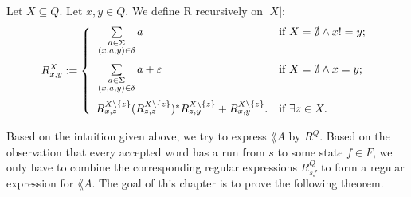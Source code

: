 \begin{definition}
    \label{R}
    Let $X \subseteq Q$. Let $x, y \in Q$.
    We define R recursively on $|X|$:
    \begin{equation*}
        R^X_{x,y} := \left\{  
                \begin{array}{ll}
                    \vphantom{ \sum\limits_{ \substack{ a \in \Sigma\\ (x,a,y) \in \delta \\ b \in \Sigma } } }
                    \sum\limits_{
                        \substack{
                            a \in \Sigma\\
                            (x,a,y) \in \delta
                        }
                    } a 
                    & \mbox{if } X = \emptyset \wedge x != y; \\
                    \vphantom{ \sum\limits_{ \substack{ a \in \Sigma\\ (x,a,y) \in \delta \\ b \in \Sigma } } }
                    \sum\limits_{
                        \substack{
                            a \in \Sigma\\
                            (x,a,y) \in \delta
                        }
                    } a + \varepsilon 
                    & \mbox{if } X = \emptyset \wedge x = y; \\
                     R^{X\backslash\{z\}}_{x,z} (R^{X\backslash\{z\}}_{z,z})^* R^{X\backslash\{z\}}_{z,y} + R^{X\backslash\{z\}}_{x,y}.
                     & \mbox{if } \exists z \in X.
                \end{array}
            \right.
    \end{equation*}
\end{definition}

Based on the intuition given above, we try to express $\lang{A}$ by $R^Q$.
Based on the observation that every accepted word has a run from $s$ to some state $f \in F$, 
we only have to combine the corresponding regular expressions $R^Q_{sf}$ to form a regular expression for $\lang{A}$.
The goal of this chapter is to prove the following theorem. 

\begin{theorem}
    \label{R_L}
\end{theorem}
